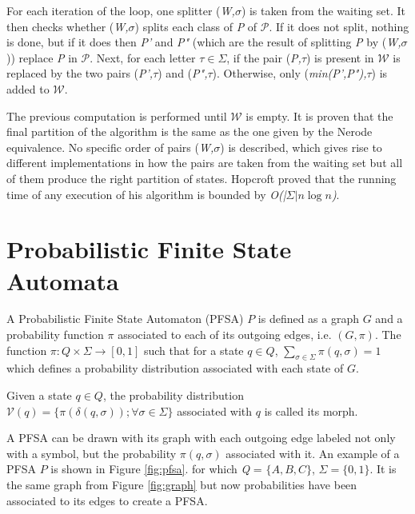 {For each iteration of the loop, one splitter (\textit{W,$\sigma$}) is taken from the waiting set. It then checks whether (\textit{W,$\sigma$}) splits each class of \textit{P} of $\mathcal{P}$. If it does not split, nothing is done, but if it does then \textit{P'} and \textit{P"} (which are the result of splitting \textit{P} by (\textit{W,$\sigma$})) replace \textit{P} in $\mathcal{P}$. Next, for each letter $\tau\in\Sigma$, if the pair (\textit{P,$\tau$}) is present in $\mathcal{W}$ is replaced by the two pairs (\textit{P',$\tau$}) and (\textit{P",$\tau$}). Otherwise, only (\textit{min(P',P"),$\tau$}) is added to $\mathcal{W}$.

The previous computation is performed until $\mathcal{W}$ is empty. It is proven that the final partition of the algorithm is the same as the one given by the Nerode equivalence. No specific order of pairs (\textit{W,$\sigma$}) is described, which gives rise to different implementations in how the pairs are taken from the waiting set but all of them produce the right partition of states. Hopcroft proved that the running time of any execution of his algorithm is bounded by \textit{O(|$\Sigma| n\log n$)}.

\section{Probabilistic Finite State Automata}

\begin{definition}\label{definition:pfsa}
A Probabilistic Finite State Automaton (PFSA) $P$ is defined as a graph $G$ and a probability function $\pi$ associated to each of its outgoing edges, i.e. $(G, \pi)$. The function $\pi: Q\times\Sigma \rightarrow [0,1]$ such that for a state $q \in Q$, $\sum_{\sigma\in\Sigma}\pi(q,\sigma) = 1$ which defines a probability distribution associated with each state of $G$.
\end{definition} 

\begin{definition}\label{definition:morph}
Given a state $q \in Q$, the probability distribution $\mathcal{V}(q) = \{ \pi(\delta(q, \sigma)); \forall \sigma \in \Sigma\}$ associated with $q$ is called its morph.  
\end{definition}

A PFSA can be drawn with its graph with each outgoing edge labeled not only with a symbol, but the probability $\pi(q,\sigma)$ associated with it. An example of a PFSA $P$ is shown in Figure \ref{fig:pfsa}. for which \textit{Q} = $\{A, B, C\}$, $\Sigma = \{0, 1\}$. It is the same graph from Figure \ref{fig:graph} but now probabilities have been associated to its edges to create a PFSA.

}
